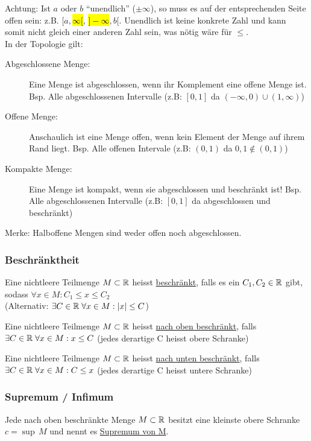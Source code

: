 Achtung: Ist $a$ oder $b$ ``unendlich'' ($\pm \infty$), so muss es auf der entsprechenden Seite offen sein: z.B. $[a, $\hl{$\infty[$}, \hl{$]-\infty$}$, b[$.
Unendlich ist keine konkrete Zahl und kann somit nicht gleich einer anderen Zahl sein, was nötig wäre für $\leq$. \\
In der Topologie gilt:
\begin{description}
	\item [Abgeschlossene Menge:] Eine Menge ist abgeschlossen, wenn ihr Komplement eine offene Menge ist. Bsp. Alle abgeschlossenen Intervalle (z.B: $[0, 1]$ da $(-\infty, 0) \cup (1, \infty)$)

	\item [Offene Menge:] Anschaulich ist eine Menge offen, wenn kein Element der Menge auf ihrem Rand liegt. Bsp. Alle offenen Intervale (z.B: $(0, 1)$ da $0,1 \notin (0, 1)$)

	\item [Kompakte Menge:] Eine Menge ist kompakt, wenn sie abgeschlossen und beschränkt ist! Bsp. Alle abgeschlossenen Intervalle (z.B: $[0, 1]$ da abgeschlossen und beschränkt)
\end{description}
Merke: Halboffene Mengen sind weder offen noch abgeschlossen.

\subsubsection{Beschränktheit}
Eine nichtleere Teilmenge $M \subset \mathbb{R}$ heisst \underline{beschränkt}, falls es ein $C_1, C_2 \in \mathbb{R}$ gibt, sodass 
$\forall x \in M: C_1 \leq x \leq C_2$\\
(Alternativ: $\exists C \in \mathbb{R} \; \forall x \in M: |x| \leq C$)

\vspace{2pt}Eine nichtleere Teilmenge $M \subset \mathbb{R}$ heisst \underline{nach oben beschränkt}, falls 
$\exists C \in \mathbb{R} \; \forall x \in M: x \leq C$ \hspace{2pt} {\scriptsize(jedes derartige C heisst obere Schranke)}

\vspace{2pt}Eine nichtleere Teilmenge $M \subset \mathbb{R}$ heisst \underline{nach unten beschränkt}, falls 
$\exists C \in \mathbb{R} \; \forall x \in M: C \leq x$ \hspace{2pt} {\scriptsize(jedes derartige C heisst untere Schranke)}

\subsubsection{Supremum / Infimum}
Jede nach oben beschränkte Menge $M \subset \mathbb{R}$ besitzt eine kleinste obere Schranke $c = \sup \, M$ und nennt es \underline{Supremum von M}.

